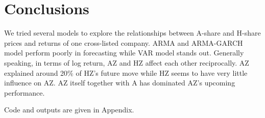 \documentclass[aps,pre,12pt,preprint,onecolumn,showpacs,showkeys]{revtex4-1}
\begin{document}

\section{Conclusions}


    We tried several models to explore the relationships between A-share and H-share prices and returns of one cross-listed company. ARMA and ARMA-GARCH model perform poorly in forecasting while VAR model stands out. Generally speaking, in terms of log return, AZ and HZ affect each other reciprocally. AZ explained around 20\% of HZ’s future move while HZ seems to have very little influence on AZ. AZ itself together with A has dominated AZ’s upcoming performance.
\appendix
\begin{thebibliography}{}
     Code and outputs are given in Appendix.
\end{thebibliography}
\end{document}
